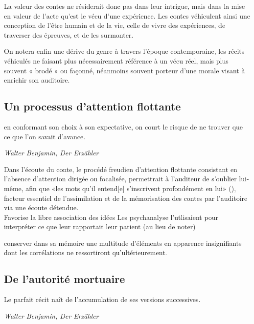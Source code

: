 La valeur des contes ne résiderait donc pas dans leur intrigue, mais dans la mise en valeur de l'acte qu'est le vécu d'une expérience. Les contes véhiculent ainsi une conception de l'être humain et de la vie, celle de vivre des expériences, de traverser des épreuves, et de les surmonter.

On notera enfin une dérive du genre à travers l'époque contemporaine, les récits véhiculés ne faisant plus nécessairement référence à un vécu réel, mais plus souvent « brodé » ou façonné, néanmoins souvent porteur d'une morale visant à enrichir son auditoire.


\subsection{Un processus d'attention flottante}

\begin{shadequote}
[...] en conformant son choix à son expectative, on court le risque de ne trouver que ce que l'on savait d'avance.
\par\emph{Walter Benjamin, Der Erzähler}
\end{shadequote}

Dans l'écoute du conte, le procédé freudien d'attention flottante \cite{freud1996ratschlage} consistant en l'absence d'attention dirigée ou focalisée, permettrait à l'auditeur de s'oublier lui-même, afin que «les mots qu'il entend[e] s'inscrivent profondément en lui» (\cite{benjamin1991gesammelte}), facteur essentiel de l'assimilation et de la mémorisation des contes par l'auditoire via une écoute détendue.\\

Favorise la libre association des idées
Les psychanalyse l'utlisaient pour interpréter ce que leur rapportait leur patient (au lieu de noter)

conserver dans sa mémoire une multitude d'éléments en apparence insignifiants dont les corrélations ne ressortiront qu'ultérieurement.

\subsection{De l'autorité mortuaire}

\begin{shadequote}
Le parfait récit naît de l'accumulation de ses versions successives. \par\emph{Walter Benjamin, Der Erzähler}
\end{shadequote}

